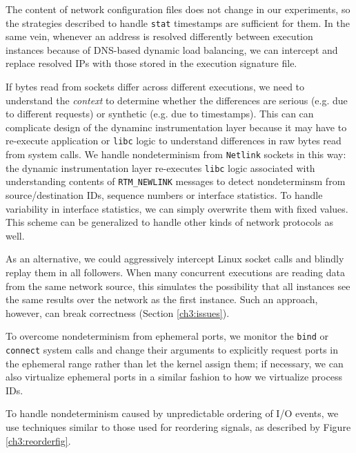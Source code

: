  \newline
The content of network configuration files
does not change in our experiments, so the strategies 
described to handle \texttt{stat} timestamps 
are sufficient for them. In the same vein, whenever an address is resolved
differently between execution instances because of DNS-based dynamic load balancing, 
we can intercept and replace resolved IPs with those
stored in the execution signature file.

If bytes read from sockets differ across different executions,
we need to understand the {\em context} to determine whether the
differences are serious (e.g. due to different requests)
or synthetic (e.g. due to timestamps). This can
can complicate design of the dynaminc instrumentation
layer because it 
may have to re-execute application or \texttt{libc}
logic to understand differences in raw bytes read from system calls.
We handle nondeterminism from \texttt{Netlink}
sockets in this way: the dynamic instrumentation layer 
re-executes \texttt{libc} logic associated
with understanding contents of \texttt{RTM\_NEWLINK}
messages to detect nondeterminsm from source/destination 
IDs, sequence numbers or interface statistics.
To handle variability in interface statistics,
we can simply overwrite them with fixed values.
This scheme can be generalized to handle
other kinds of network protocols as well.

As an alternative, we could
aggressively intercept Linux socket calls
and blindly replay them in all followers.
When many concurrent executions are reading data from the
same network source, this simulates the possibility
that all instances see the same results over the network
as the first instance. Such an approach, however,
can break correctness (Section \ref{ch3:issues}).
          
\newpage 
To overcome nondeterminism from ephemeral ports, 
we monitor the \texttt{bind} or \texttt{connect} 
system calls and change their arguments to explicitly request ports
in the ephemeral range rather than let the kernel 
assign them; if necessary,
we can also virtualize ephemeral ports
in a similar fashion to how we virtualize process IDs. \newline


 \newline
To handle nondeterminism caused by unpredictable
ordering of I/O events,
we use techniques similar to those used 
for reordering signals,
as described by Figure \ref{ch3:reorderfig}.

